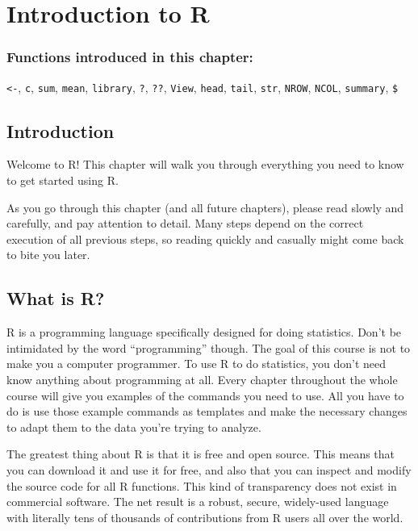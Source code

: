 \documentclass[
]{book}
\begin{document}
\hypertarget{intror}{%
\chapter{Introduction to R}\label{intror}}

\hypertarget{functions-introduced-in-this-chapter}{%
\subsection*{Functions introduced in this chapter:}\label{functions-introduced-in-this-chapter}}

\texttt{\textless{}-}, \texttt{c}, \texttt{sum}, \texttt{mean}, \texttt{library}, \texttt{?}, \texttt{??}, \texttt{View}, \texttt{head}, \texttt{tail}, \texttt{str}, \texttt{NROW}, \texttt{NCOL}, \texttt{summary}, \texttt{\$}

\hypertarget{intror-intro}{%
\section{Introduction}\label{intror-intro}}

Welcome to R! This chapter will walk you through everything you need to know to get started using R.

As you go through this chapter (and all future chapters), please read slowly and carefully, and pay attention to detail. Many steps depend on the correct execution of all previous steps, so reading quickly and casually might come back to bite you later.

\hypertarget{intror-whatisr}{%
\section{What is R?}\label{intror-whatisr}}

R is a programming language specifically designed for doing statistics. Don't be intimidated by the word ``programming'' though. The goal of this course is not to make you a computer programmer. To use R to do statistics, you don't need know anything about programming at all. Every chapter throughout the whole course will give you examples of the commands you need to use. All you have to do is use those example commands as templates and make the necessary changes to adapt them to the data you're trying to analyze.

The greatest thing about R is that it is free and open source. This means that you can download it and use it for free, and also that you can inspect and modify the source code for all R functions. This kind of transparency does not exist in commercial software. The net result is a robust, secure, widely-used language with literally tens of thousands of contributions from R users all over the world.
\end{document}
